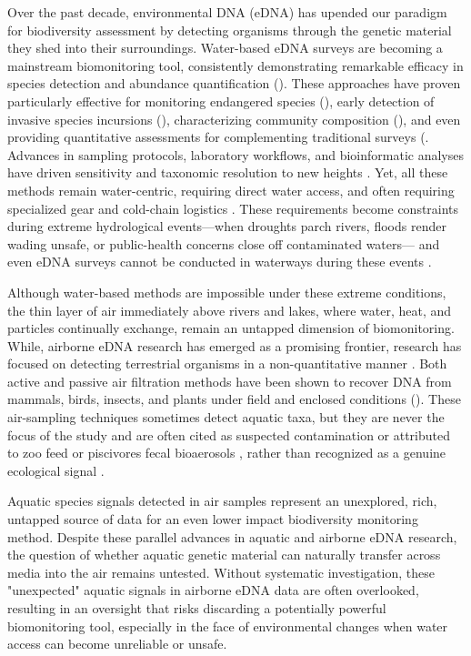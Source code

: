 \documentclass{article}
\begin{document}
Over the past decade, environmental DNA (eDNA) has upended our paradigm for biodiversity assessment by detecting organisms through the genetic material they shed into their surroundings. Water-based eDNA surveys are becoming a mainstream biomonitoring tool, consistently demonstrating remarkable efficacy in species detection and abundance quantification (\cite{altermatt2025}). These approaches have proven particularly effective for monitoring endangered species (\cite{biggs2015}), early detection of invasive species incursions (\cite{thomas2020}), characterizing community composition (\cite{wilkinson2024}), and even providing quantitative assessments for complementing traditional surveys (\cite{allan2023,guri2024a,tillotson2018}. Advances in sampling protocols, laboratory workflows, and bioinformatic analyses have driven sensitivity and taxonomic resolution to new heights \cite{altermatt2025}. Yet, all these methods remain water-centric, requiring direct water access, and often requiring specialized gear and cold-chain logistics \cite{deiner2017,spens2017}. These requirements become constraints during extreme hydrological events—when droughts parch rivers, floods render wading unsafe, or public-health concerns close off contaminated waters— and even eDNA surveys cannot be conducted in waterways during these events \cite{chen2024,ruiz-ramos2023,wan2023}.

Although water-based methods are impossible under these extreme conditions, the thin layer of air immediately above rivers and lakes, where water, heat, and particles continually exchange, remain an untapped dimension of biomonitoring. While, airborne eDNA research has emerged as a promising frontier, research has  focused on detecting terrestrial organisms in a non-quantitative manner \cite{klepke2022,johnson2024,lynggaard2023}. Both active and passive air filtration methods have been shown to recover DNA from mammals, birds, insects, and plants under field and enclosed conditions (\cite{clare2021,garrett2023,johnson2019,johnson2023,lynggaard2024, roger2022, lynggaard2022}). These air-sampling techniques sometimes detect aquatic taxa, but they are never the focus of the study and are often cited as suspected contamination or attributed to zoo feed or piscivores fecal bioaerosols \cite{sullivan2023,klepke2022,lynggaard2023,lynggaard2022}, rather than recognized as a genuine ecological signal \cite{tournayre2025}.

Aquatic species signals detected in air samples represent an unexplored, rich, untapped source of data for an even lower impact biodiversity monitoring method. Despite these parallel advances in aquatic and airborne eDNA research, the question of whether aquatic genetic material can naturally transfer across media into the air remains untested. Without systematic investigation, these "unexpected" aquatic signals in airborne eDNA data are often overlooked, resulting in an oversight that risks discarding a potentially powerful biomonitoring tool, especially in the face of environmental changes when water access can become unreliable or unsafe.
\end{document}
